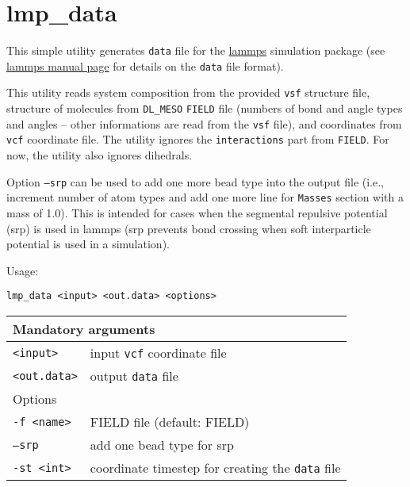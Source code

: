 \section{lmp\_data} \label{sec:lmp_data}

This simple utility generates \texttt{data} file for the
\href{https://lammps.sandia.gov/}{lammps} simulation package (see
\href{https://lammps.sandia.gov/doc/read_data.html}{lammps manual page} for
details on the \texttt{data} file format).

This utility reads system composition from the provided \texttt{vsf}
structure file, structure of molecules  from \texttt{DL\_MESO}
\texttt{FIELD} file (numbers of bond and angle types and angles -- other
informations are read from the \texttt{vsf} file), and coordinates from
\texttt{vcf} coordinate file.  The utility ignores the
\texttt{interactions} part from \texttt{FIELD}. For now, the utility also
ignores dihedrals.

Option \texttt{--srp} can be used to add one more bead type into the output
file (i.e., increment number of atom types and add one more line for
\texttt{Masses} section with a mass of 1.0). This is intended for cases
when the segmental repulsive potential (srp) is used in lammps (srp
prevents bond crossing when soft interparticle potential is used in a
simulation).

Usage:

\vspace{1em}
\noindent
\texttt{lmp\_data <input> <out.data> <options>}

\noindent
\begin{longtable}{p{}p{}}
  \toprule
  \multicolumn{2}{l}{Mandatory arguments} \\
  \midrule
  \texttt{<input>} & input \texttt{vcf} coordinate file \\
  \texttt{<out.data>} & output \texttt{data} file \\
  \toprule
  \multicolumn{2}{l}{Options} \\
  \midrule
  \texttt{-f <name>} & FIELD file (default: FIELD)\\
  \texttt{--srp} & add one bead type for srp\\
  \texttt{-st <int>} & coordinate timestep for creating the \texttt{data}
  file \\
  \bottomrule
\end{longtable}

